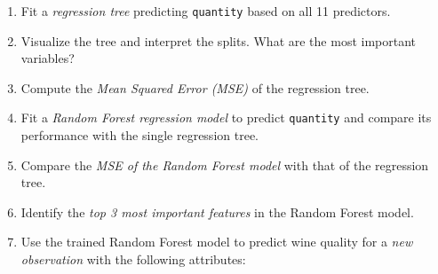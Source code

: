 \documentclass[
]{book}
\newcommand{\passthrough}[1]{#1}
\providecommand{\tightlist}{%
  \setlength{\itemsep}{0pt}\setlength{\parskip}{0pt}}
\theoremstyle{definition}
\theoremstyle{definition}
\theoremstyle{definition}
\theoremstyle{definition}
\theoremstyle{remark}
\begin{document}
\begin{enumerate}
\def\labelenumi{\arabic{enumi}.}
\setcounter{enumi}{40}
\tightlist
\item
  Fit a \emph{regression tree} predicting \passthrough{\lstinline!quantity!} based on all 11 predictors.\\
\item
  Visualize the tree and interpret the splits. What are the most important variables?\\
\item
  Compute the \emph{Mean Squared Error (MSE)} of the regression tree.\\
\item
  Fit a \emph{Random Forest regression model} to predict \passthrough{\lstinline!quantity!} and compare its performance with the single regression tree.\\
\item
  Compare the \emph{MSE of the Random Forest model} with that of the regression tree.\\
\item
  Identify the \emph{top 3 most important features} in the Random Forest model.\\
\item
  Use the trained Random Forest model to predict wine quality for a \emph{new observation} with the following attributes:


\end{enumerate}
\end{document}
